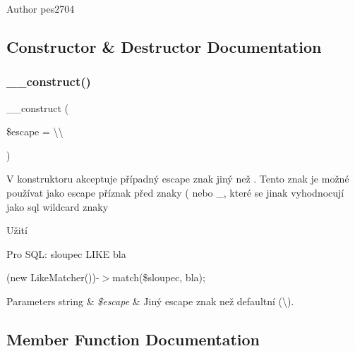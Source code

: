 \begin{DoxyAuthor}{Author}
pes2704 
\end{DoxyAuthor}


\subsection{Constructor \& Destructor Documentation}
\mbox{\label{class_pes_1_1_query_1_1_matcher_1_1_like_matcher_a11119d8e9d3e88844b5dd2ed47657758}} 
\subsubsection{\texorpdfstring{\+\_\+\+\_\+construct()}{\_\_construct()}}
{\footnotesize\ttfamily \+\_\+\+\_\+construct (\begin{DoxyParamCaption}\item[{}]{\$escape = {\ttfamily \textquotesingle{}\textbackslash{}\textbackslash{}\textquotesingle{}} }\end{DoxyParamCaption})}

V konstruktoru akceptuje případný escape znak jiný než . Tento znak je možné používat jako escape příznak před znaky (\textquotesingle{}\textquotesingle{} nebo \textquotesingle{}\+\_\+\textquotesingle{}, které se jinak vyhodnocují jako sql wildcard znaky 

Užití

Pro S\+QL\+: sloupec L\+I\+KE \textquotesingle{}bla\textquotesingle{}

{\ttfamily  (new Like\+Matcher())-\/$>$match(\$sloupec, \textquotesingle{}bla\textquotesingle{}); {\ttfamily  
\begin{DoxyParams}[1]{Parameters}
string & {\em \$escape} & Jiný escape znak než defaultní (\textquotesingle{}\textbackslash{}\textquotesingle{}). \\
\hline
\end{DoxyParams}
}}

\subsection{Member Function Documentation}
\mbox{\label{class_pes_1_1_query_1_1_matcher_1_1_like_matcher_af38750109828e091458dbb0481a2a0d7}} 
